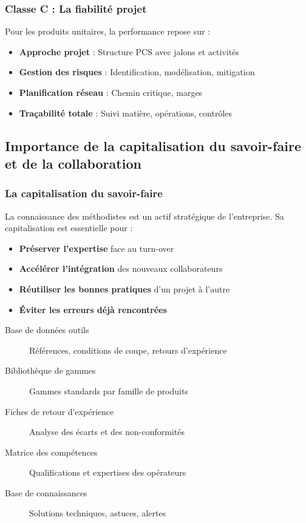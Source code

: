 \documentclass{article}
\begin{document}
\begin{table}[h]
\subsubsection{Classe C : La fiabilité projet}

Pour les produits unitaires, la performance repose sur :
\begin{itemize}
    \item \textbf{Approche projet} : Structure PCS avec jalons et activités
    \item \textbf{Gestion des risques} : Identification, modélisation, mitigation
    \item \textbf{Planification réseau} : Chemin critique, marges
    \item \textbf{Traçabilité totale} : Suivi matière, opérations, contrôles
\end{itemize}

\subsection*{Importance de la capitalisation du savoir-faire et de la collaboration}

\subsubsection{La capitalisation du savoir-faire}

La connaissance des méthodistes est un actif stratégique de l'entreprise. Sa capitalisation est essentielle pour :
\begin{itemize}
    \item \textbf{Préserver l'expertise} face au turn-over
    \item \textbf{Accélérer l'intégration} des nouveaux collaborateurs
    \item \textbf{Réutiliser les bonnes pratiques} d'un projet à l'autre
    \item \textbf{Éviter les erreurs déjà rencontrées}
\end{itemize}

\begin{tcolorbox}[colback=grisclair, colframe=gray!70!black, title=Outils de capitalisation du savoir-faire]
\begin{description}
    \item[Base de données outils] Références, conditions de coupe, retours d'expérience
    \item[Bibliothèque de gammes] Gammes standards par famille de produits
    \item[Fiches de retour d'expérience] Analyse des écarts et des non-conformités
    \item[Matrice des compétences] Qualifications et expertises des opérateurs
    \item[Base de connaissances] Solutions techniques, astuces, alertes
\end{description}
\end{tcolorbox}


\end{table}
\end{document}
